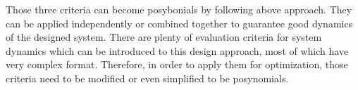 Those three criteria can become posybonials by following above approach. They can be applied independently or combined together to guarantee good dynamics of the designed system. There are plenty of evaluation criteria for system dynamics which can be introduced to this design approach, most of which have very complex format. Therefore, in order to apply them for optimization, those criteria need to be modified or even simplified to be posynomials.